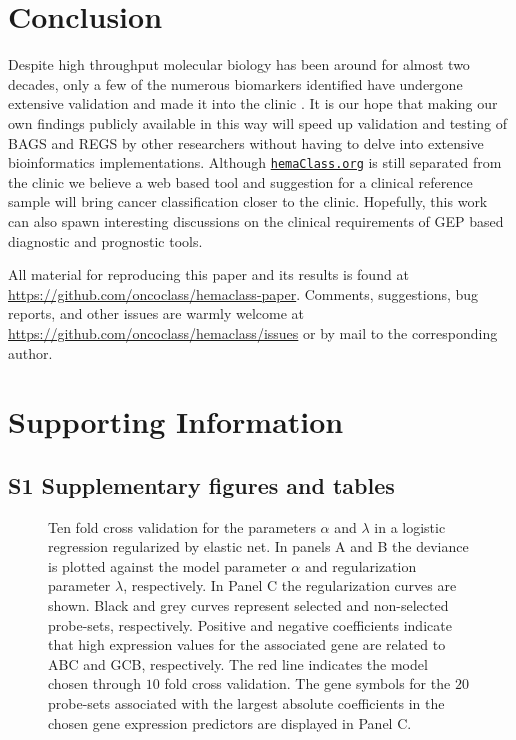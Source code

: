 \documentclass[10pt,letterpaper]{article}
\newcommand{\hemaClass}{\href{http://hemaClass.org}{\texttt{hemaClass.org}}}
\begin{document}
\section*{Conclusion}
Despite high throughput molecular biology has been around for almost two decades, only a few of the numerous biomarkers identified have undergone extensive validation and made it into the clinic \cite{Chen2012a}.
It is our hope that making our own findings publicly available in this way will speed up validation and testing of BAGS and REGS by other researchers without having to delve into extensive bioinformatics implementations.
Although \hemaClass{} is still separated from the clinic we believe a web based tool and suggestion for a clinical reference sample will bring cancer classification closer to the clinic.
Hopefully, this work can also spawn interesting discussions on the clinical requirements of GEP based diagnostic and prognostic tools.

All material for reproducing this paper and its results is found at \url{https://github.com/oncoclass/hemaclass-paper}.
Comments, suggestions, bug reports, and other issues are warmly welcome at \url{https://github.com/oncoclass/hemaclass/issues} or by mail to the corresponding author.

\section*{Supporting Information}
\renewcommand{\theequation}{S\arabic{equation}}
\renewcommand{\thefigure}{S\arabic{figure}}
\renewcommand{\thetable}{S\arabic{table}}
\renewcommand{\thesection}{S\arabic{section}}

\subsection*{S1 Supplementary figures and tables}

\begin{figure}[!ht]
\caption{Ten fold cross validation for the parameters $\alpha$ and $\lambda$ in a logistic regression regularized by elastic net.
In panels A and B the deviance is plotted against the model parameter $\alpha$ and regularization parameter $\lambda$, respectively.
In Panel C the regularization curves are shown.
Black and grey curves represent selected and non-selected probe-sets, respectively.
Positive and negative coefficients indicate that high expression values for the associated gene are related to ABC and GCB, respectively.
The red line indicates the model chosen through $10$ fold cross validation.
The gene symbols for the $20$ probe-sets associated with the largest absolute coefficients in the chosen gene expression predictors are displayed in Panel C.}
\label{fig:crossval}
\end{figure}
\end{document}
